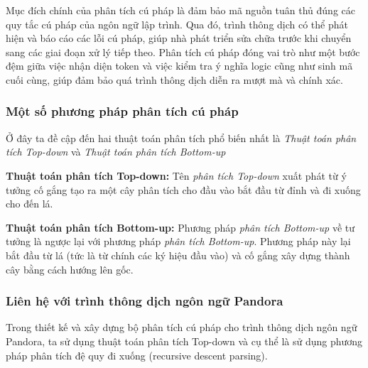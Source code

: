     
    
    
    

Mục đích chính của phân tích cú pháp là đảm bảo mã nguồn tuân thủ đúng các quy tắc cú pháp của ngôn ngữ lập trình. Qua đó, trình thông dịch có thể phát hiện và báo cáo các lỗi cú pháp, giúp nhà phát triển sửa chữa trước khi chuyển sang các giai đoạn xử lý tiếp theo. Phân tích cú pháp đóng vai trò như một bước đệm giữa việc nhận diện token và việc kiểm tra ý nghĩa logic cũng như sinh mã cuối cùng, giúp đảm bảo quá trình thông dịch diễn ra mượt mà và chính xác.
\subsubsection{Một số phương pháp phân tích cú pháp}
Ở đây ta đề cập đến hai thuật toán phân tích phổ biến nhất là \textit{Thuật toán phân tích Top-down} và \textit{Thuật toán phân tích Bottom-up}

\textbf{Thuật toán phân tích Top-down:}
Tên \textit{phân tích Top-down} xuất phát từ ý tưởng cố gắng tạo ra một cây phân tích cho đầu vào bắt đầu từ đỉnh và đi xuống cho đến lá.

\textbf{Thuật toán phân tích Bottom-up:}
Phương pháp \textit{phân tích Bottom-up} về tư tưởng là ngược lại với phương pháp \textit{phân tích Bottom-up}. Phương pháp này lại bắt đầu từ lá (tức là từ chính các ký hiệu đầu vào) và cố gắng xây dựng thành cây bằng cách hướng lên gốc.

\subsubsection{Liên hệ với trình thông dịch ngôn ngữ Pandora}
Trong thiết kế và xây dựng bộ phân tích cú pháp cho trình thông dịch ngôn ngữ Pandora, ta sử dụng thuật toán phân tích Top-down và cụ thể là sử dụng phương pháp phân tích đệ quy đi xuống (recursive descent parsing).

